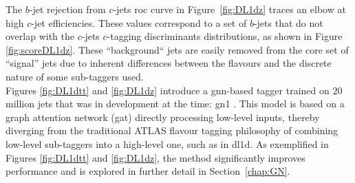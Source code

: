 The $b$-jet rejection from $c$-jets \gls{roc} curve in Figure~\ref{fig:DL1dz} traces an elbow at high $c$-jet efficiencies. These values correspond to a set of $b$-jets that do not overlap with the $c$-jets $c$-tagging discriminants distributions, as shown in Figure \ref{fig:scoreDL1dz}. These ``background`` jets are easily removed from the core set of ``signal'' jets due to inherent differences between the flavours and the discrete nature of some sub-taggers used. \\

Figures \ref{fig:DL1dtt} and \ref{fig:DL1dz} introduce a \gls{gnn}-based tagger trained on 20 million jets that was in development at the time: \gls{gn1} \cite{ATL-PHYS-PUB-2022-027}. This model is based on a graph attention network (\gls{gat}) directly processing low-level inputs, thereby diverging from the traditional ATLAS flavour tagging philosophy of combining low-level sub-taggers into a high-level one, such as in \gls{dl1d}. As exemplified in Figures \ref{fig:DL1dtt} and \ref{fig:DL1dz}, the method significantly improves performance and is explored in further detail in Section~\ref{chap:GN}. \\


